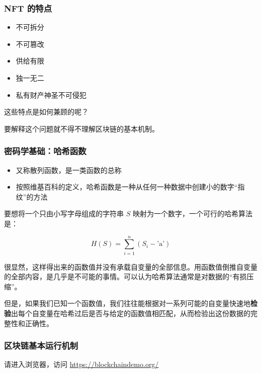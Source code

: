 \documentclass{beamer}
\begin{document}
\begin{frame}
    \frametitle{NFT 的特点}

    \begin{itemize}
        \item 不可拆分
        \item 不可篡改
        \item 供给有限
        \item 独一无二
        \item 私有财产神圣不可侵犯
    \end{itemize}

    这些特点是如何兼顾的呢？
    
    要解释这个问题就不得不理解区块链的基本机制。
\end{frame}

\begin{frame}
    \frametitle{密码学基础：哈希函数}

    \begin{itemize}
        \item 又称散列函数，是一类函数的总称
        \item 按照维基百科的定义，哈希函数是一种从任何一种数据中创建小的数字“指纹”的方法
    \end{itemize}

    要想将一个只由小写字母组成的字符串 $S$ 映射为一个数字，一个可行的哈希算法是：

    $$H(S) = \sum_{i = 1}^n (S_i-\text{'a'})$$

    很显然，这样得出来的函数值并没有承载自变量的全部信息。用函数值倒推自变量的全部内容，是几乎是不可能的事情。可以认为哈希算法通常是对数据的“有损压缩”。
    
    但是，如果我们已知一个函数值，我们往往能根据对一系列可能的自变量快速地\textbf{检验}出每个自变量在哈希过后是否与给定的函数值相匹配，从而检验出这份数据的完整性和正确性。

\end{frame}

\begin{frame}
    \frametitle{区块链基本运行机制}

    请进入浏览器，访问 \url{https://blockchaindemo.org/}

\end{frame}
\end{document}
